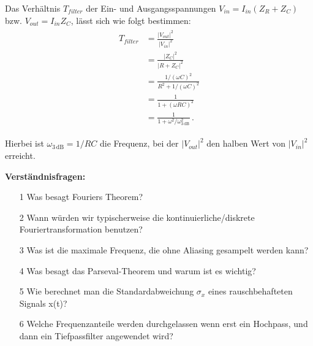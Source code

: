 Das Verh\"altnis $T_{filter}$ der Ein- und Ausgangsspannungen $V_{in} = I_{in} (Z_R + Z_C)$ bzw. $V_{out} = I_{in} Z_C$, l\"asst sich wie folgt bestimmen:
\begin{align}
    \begin{split}
        T_{filter} &= \frac{|V_{out}|^2}{|V_{in}|^2}\\
        &= \frac{|Z_C|^2}{|R + Z_C|^2}\\
        &= \frac{1/(\omega C)^2}{R^2 + 1/(\omega C)^2}\\
        &= \frac{1}{1 + (\omega R C)^2}\\
        &= \frac{1}{1 + \omega^2 / \omega_{3\,\text{dB}}^2}\,.
        \label{eq:vl10-5}
    \end{split}
\end{align}

Hierbei ist $\omega_{3\,\text{dB}} = 1/RC$ die Frequenz, bei der $|V_{out}|^2$ den halben Wert von $|V_{in}|^2$ erreicht.\\[0.3 cm]




\newpage

\begin{tcolorbox}[enhanced,width=6in,
    fontupper=\small,drop fuzzy shadow southwest,
    colframe=black!50!black,colback=black!5]
\textbf{Verständnisfragen:} \\
\begin{enumerate}
\item[1] Was besagt Fouriers Theorem?
\item[2] Wann würden wir typischerweise die kontinuierliche/diskrete Fouriertransformation benutzen?
\item[3] Was ist die maximale Frequenz, die ohne Aliasing gesampelt werden kann?
\item[4] Was besagt das Parseval-Theorem und warum ist es wichtig? 
\item[5] Wie berechnet man die Standardabweichung $\sigma_x$ eines rauschbehafteten Signals x(t)?
\item[6] Welche Frequenzanteile werden durchgelassen wenn erst ein Hochpass, und dann ein Tiefpassfilter angewendet wird? 
\end{enumerate}
\end{tcolorbox}

